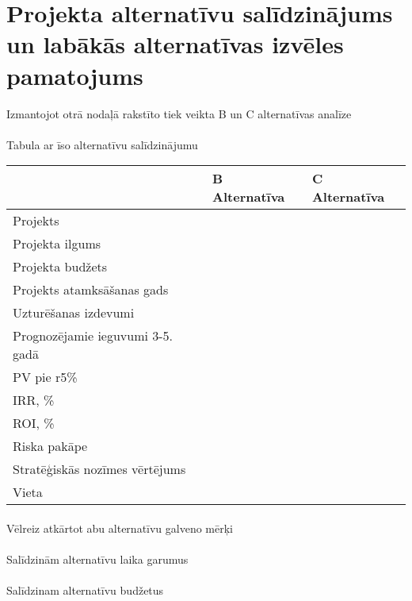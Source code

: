 \section{Projekta alternatīvu salīdzinājums un labākās alternatīvas izvēles pamatojums}
Izmantojot otrā nodaļā rakstīto tiek veikta B un C alternatīvas analīze
\paragraph{}
Tabula ar īso alternatīvu salīdzinājumu
\begin{table}[!ht]
    \centering
    \begin{tabular}{|l|p{6em}|p{6em}|}
        \hline
        \textbf{} & \textbf{B Alternatīva} & \textbf{C Alternatīva} \\
        \hline
        Projekts & & \\
        \hline
        Projekta ilgums & & \\
        \hline
        Projekta budžets & & \\
        \hline
        Projekts atamksāšanas gads& & \\
        \hline
        Uzturēšanas izdevumi & & \\
        \hline
        Prognozējamie ieguvumi 3-5. gadā & & \\
        \hline
        PV pie r5\% & & \\
        \hline
        IRR, \% & & \\
        \hline
        ROI, \% & & \\
        \hline
        Riska pakāpe & & \\
        \hline
        Stratēģiskās nozīmes vērtējums & & \\
        \hline
        Vieta & & \\
        \hline
    \end{tabular}
\end{table}
\paragraph{}
Vēlreiz atkārtot abu alternatīvu galveno mērķi
\paragraph{}
Salīdzinām alternatīvu laika garumus
\paragraph{}
Salīdzinam alternatīvu budžetus
